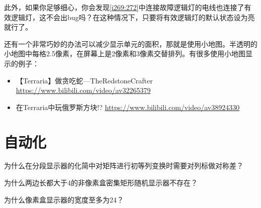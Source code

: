 此外，如果你足够细心，你会发现\autoref{i269:272}中连接故障逻辑灯的电线也连接了有效逻辑灯，这不会出bug吗？在这种情况下，只要将有效逻辑灯的默认状态设为亮就行了。

还有一个非常巧妙的办法可以减少显示单元的面积，那就是使用小地图。半透明的小地图中每格2.5像素，在屏幕上是2像素和3像素交替排列。有很多使用小地图显示的例子：
\begin{itemize}
\item 【Terraria】做贪吃蛇—TheRedstoneCrafter \url{https://www.bilibili.com/video/av32265379}
\item 在Terraria中玩俄罗斯方块!? \url{https://www.bilibili.com/video/av38924330}
\end{itemize}

\section{自动化}

\begin{problemset}[思考题]
\item 为什么在分段显示器的化简中对矩阵进行初等列变换时需要对列标做对称差？
\item 为什么两边长都大于4的非像素盒密集矩形随机显示器不存在？
\item 为什么像素盒显示器的宽度至多为24？
\end{problemset}